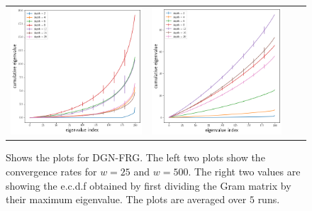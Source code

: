 \begin{figure}
{\begin{tabular}{cccc}
\includegraphics[scale=0.4]{figs/dgn-fra-ecdfbymax-w25.png}
&
\includegraphics[scale=0.4]{figs/dgn-fra-ecdfbymax-w500.png}
\end{tabular}
}
\caption{Shows the plots for DGN-FRG. The left two plots show the convergence rates for $w=25$ and $w=500$. The right two values are showing the e.c.d.f obtained by first dividing the Gram matrix by their maximum eigenvalue. The plots are averaged over $5$ runs.}
\label{fig:dgn-frg}
\end{figure}
